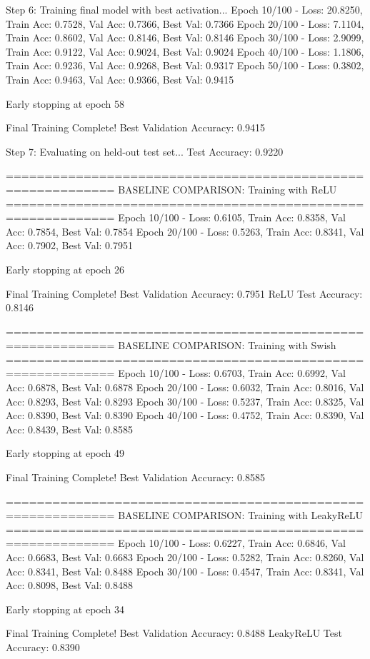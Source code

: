 Step 6: Training final model with best activation...
Epoch  10/100 - Loss: 20.8250, Train Acc: 0.7528, Val Acc: 0.7366, Best Val: 0.7366
Epoch  20/100 - Loss: 7.1104, Train Acc: 0.8602, Val Acc: 0.8146, Best Val: 0.8146
Epoch  30/100 - Loss: 2.9099, Train Acc: 0.9122, Val Acc: 0.9024, Best Val: 0.9024
Epoch  40/100 - Loss: 1.1806, Train Acc: 0.9236, Val Acc: 0.9268, Best Val: 0.9317
Epoch  50/100 - Loss: 0.3802, Train Acc: 0.9463, Val Acc: 0.9366, Best Val: 0.9415

Early stopping at epoch 58

Final Training Complete!
Best Validation Accuracy: 0.9415

Step 7: Evaluating on held-out test set...
Test Accuracy: 0.9220

============================================================
BASELINE COMPARISON: Training with ReLU
============================================================
Epoch  10/100 - Loss: 0.6105, Train Acc: 0.8358, Val Acc: 0.7854, Best Val: 0.7854
Epoch  20/100 - Loss: 0.5263, Train Acc: 0.8341, Val Acc: 0.7902, Best Val: 0.7951

Early stopping at epoch 26

Final Training Complete!
Best Validation Accuracy: 0.7951
ReLU Test Accuracy: 0.8146

============================================================
BASELINE COMPARISON: Training with Swish
============================================================
Epoch  10/100 - Loss: 0.6703, Train Acc: 0.6992, Val Acc: 0.6878, Best Val: 0.6878
Epoch  20/100 - Loss: 0.6032, Train Acc: 0.8016, Val Acc: 0.8293, Best Val: 0.8293
Epoch  30/100 - Loss: 0.5237, Train Acc: 0.8325, Val Acc: 0.8390, Best Val: 0.8390
Epoch  40/100 - Loss: 0.4752, Train Acc: 0.8390, Val Acc: 0.8439, Best Val: 0.8585

Early stopping at epoch 49

Final Training Complete!
Best Validation Accuracy: 0.8585

============================================================
BASELINE COMPARISON: Training with LeakyReLU
============================================================
Epoch  10/100 - Loss: 0.6227, Train Acc: 0.6846, Val Acc: 0.6683, Best Val: 0.6683
Epoch  20/100 - Loss: 0.5282, Train Acc: 0.8260, Val Acc: 0.8341, Best Val: 0.8488
Epoch  30/100 - Loss: 0.4547, Train Acc: 0.8341, Val Acc: 0.8098, Best Val: 0.8488

Early stopping at epoch 34

Final Training Complete!
Best Validation Accuracy: 0.8488
LeakyReLU Test Accuracy: 0.8390

